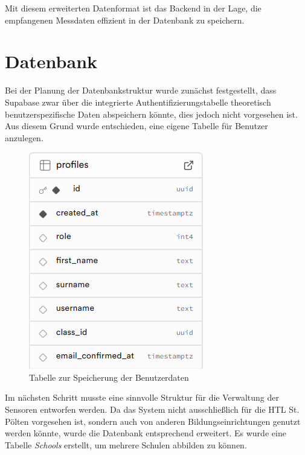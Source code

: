 \begin{inhalt}
Mit diesem erweiterten Datenformat ist das Backend in der Lage, die empfangenen Messdaten effizient in der Datenbank zu speichern.

\newpage


\section{Datenbank}

\label{ref:profile-table-design}
Bei der Planung der Datenbankstruktur wurde zunächst festgestellt, dass Supabase zwar über die integrierte Authentifizierungstabelle theoretisch benutzerspezifische Daten abspeichern könnte, dies jedoch nicht vorgesehen ist. Aus diesem Grund wurde entschieden, eine eigene Tabelle für Benutzer anzulegen.

\begin{figure}[!htb]
  \centering
  \includegraphics[scale=0.5]{files/Thomas/pics/Datenbank_Design/profiles.png}
  \caption[Benutzertabelle der Datenbank]{Tabelle zur Speicherung der Benutzerdaten}
  \label{fig:profiles_tabelle}
\end{figure}

Im nächsten Schritt musste eine sinnvolle Struktur für die Verwaltung der Sensoren entworfen werden. Da das System nicht ausschließlich für die HTL St. Pölten vorgesehen ist, sondern auch von anderen Bildungseinrichtungen genutzt werden könnte, wurde die Datenbank entsprechend erweitert. Es wurde eine Tabelle \textit{Schools} erstellt, um mehrere Schulen abbilden zu können.


\end{inhalt}
